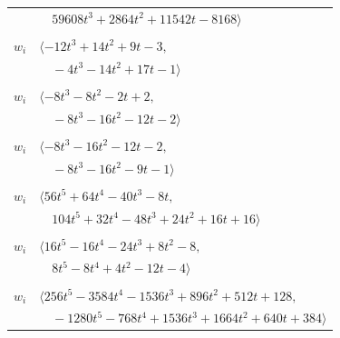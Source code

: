 \documentclass[11pt]{article}
\begin{document}
\begin{longtable}{@{}ll@{}}
 & $\quad 59608t^{3}+2864t^{2}+11542t-8168\rangle$\\
\addlinespace[2pt]
\multicolumn{2}{@{}p{0.97\textwidth}@{}}{$i=4$, $D_i=1$, $\rho_{ij}$: $15{:}2, \allowbreak 22{:}1, \allowbreak 35{:}1, \allowbreak 37{:}1, \allowbreak 45{:}2, \allowbreak 49{:}1$}\\
$w_i$ & $\langle -12t^{3}+14t^{2}+9t-3,$\\
 & $\quad -4t^{3}-14t^{2}+17t-1\rangle$\\
\addlinespace[2pt]
\multicolumn{2}{@{}p{0.97\textwidth}@{}}{$i=5$, $D_i=2$, $\rho_{ij}$: $0{:}2, \allowbreak 21{:}1, \allowbreak 28{:}2, \allowbreak 39{:}1, \allowbreak 41{:}2$}\\
$w_i$ & $\langle -8t^{3}-8t^{2}-2t+2,$\\
 & $\quad -8t^{3}-16t^{2}-12t-2\rangle$\\
\addlinespace[2pt]
\multicolumn{2}{@{}p{0.97\textwidth}@{}}{$i=6$, $D_i=1$, $\rho_{ij}$: $0{:}1, \allowbreak 12{:}2, \allowbreak 27{:}2, \allowbreak 43{:}2, \allowbreak 47{:}1$}\\
$w_i$ & $\langle -8t^{3}-16t^{2}-12t-2,$\\
 & $\quad -8t^{3}-16t^{2}-9t-1\rangle$\\
\addlinespace[2pt]
\multicolumn{2}{@{}p{0.97\textwidth}@{}}{$i=7$, $D_i=16$, $\rho_{ij}$: $1{:}2, \allowbreak 11{:}1, \allowbreak 22{:}1, \allowbreak 25{:}2, \allowbreak 26{:}1, \allowbreak 27{:}2, \allowbreak 31{:}2, \allowbreak 33{:}2, \allowbreak 34{:}2, \allowbreak 36{:}2, \allowbreak 39{:}1$}\\
$w_i$ & $\langle 56t^{5}+64t^{4}-40t^{3}-8t,$\\
 & $\quad 104t^{5}+32t^{4}-48t^{3}+24t^{2}+16t+16\rangle$\\
\addlinespace[2pt]
\multicolumn{2}{@{}p{0.97\textwidth}@{}}{$i=8$, $D_i=4$, $\rho_{ij}$: $1{:}2, \allowbreak 13{:}1, \allowbreak 32{:}1, \allowbreak 33{:}1, \allowbreak 36{:}2$}\\
$w_i$ & $\langle 16t^{5}-16t^{4}-24t^{3}+8t^{2}-8,$\\
 & $\quad 8t^{5}-8t^{4}+4t^{2}-12t-4\rangle$\\
\addlinespace[2pt]
\multicolumn{2}{@{}p{0.97\textwidth}@{}}{$i=9$, $D_i=256$, $\rho_{ij}$: $0{:}2, \allowbreak 3{:}2, \allowbreak 20{:}2, \allowbreak 21{:}2, \allowbreak 32{:}2, \allowbreak 36{:}2, \allowbreak 43{:}2, \allowbreak 48{:}1$}\\
$w_i$ & $\langle 256t^{5}-3584t^{4}-1536t^{3}+896t^{2}+512t+128,$\\
 & $\quad -1280t^{5}-768t^{4}+1536t^{3}+1664t^{2}+640t+384\rangle$\\

\end{longtable}
\end{document}
